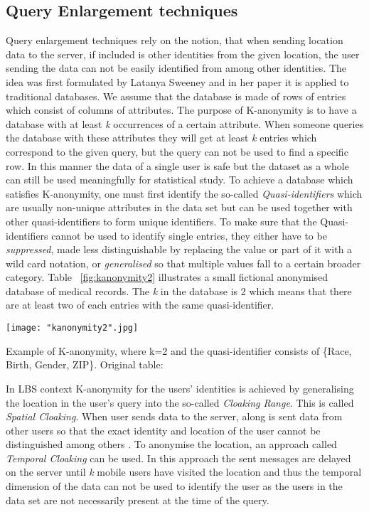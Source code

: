 \documentclass[english]{tktltiki2}
\theoremstyle{definition}
\theoremstyle{remark}
\begin{document}
\subsection{Query Enlargement techniques}

Query enlargement techniques rely on the notion, that when sending location data to the server, if included is other identities from the given location, the user sending the data can not be easily identified from among other identities. The idea was first formulated by Latanya Sweeney\cite{Sweeney:2002:KAM:774544.774552} and in her paper it is applied to traditional databases. We assume that the database is made of rows of entries which consist of columns of attributes. The purpose of K-anonymity is to have a database with at least \textit{k} occurrences of a certain attribute. When someone queries the database with these attributes they will get at least \textit{k} entries which correspond to the given query, but the query can not be used to find a specific row. In this manner the data of a single user is safe but the dataset as a whole can still be used meaningfully for statistical study. To achieve a database which satisfies K-anonymity, one must first identify the so-called \textit{Quasi-identifiers} which are usually non-unique attributes in the data set but can be used together with other quasi-identifiers to form unique identifiers. To make sure that the Quasi-identifiers cannot be used to identify single entries, they either have to be \textit{suppressed}, made less distinguishable by replacing the value or part of it with a wild card notation, or \textit{generalised} so that multiple values fall to a certain broader category. Table ~\ref{fig:kanonymity2} illustrates a small fictional anonymised database of medical records. The \textit{k} in the database is 2 which means that there are at least two of each entries with the same quasi-identifier.

\begin{table}
\centering
{}
\texttt{[image: "kanonymity2".jpg]}
\caption{Example of K-anonymity, where k=2 and the quasi-identifier consists of \{Race, Birth, Gender, ZIP\}. Original table: \cite{Sweeney:2002:KAM:774544.774552} }
\label{fig:kanonymity2}
\end{table} 

In LBS context K-anonymity for the users' identities is achieved by generalising the location in the user's query into the so-called \textit{Cloaking Range}. This is called \textit{Spatial Cloaking}. When user sends data to the server, along is sent data from other users so that the exact identity and location of the user cannot be distinguished among others \cite{Gedik2008}. To anonymise the location, an approach called \textit{Temporal Cloaking} can be used. In this approach the sent messages are delayed on the server until \textit{k} mobile users have visited the location and thus the temporal dimension of the data can not be used to identify the user as the users in the data set are not necessarily present at the time of the query.
\end{document}
